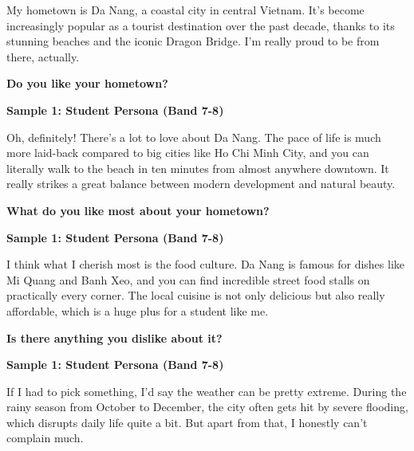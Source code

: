 My hometown is Da Nang, a coastal city in central Vietnam. It's become increasingly popular as a tourist destination over the past decade, thanks to its stunning beaches and the iconic Dragon Bridge. I'm really proud to be from there, actually.

\separator

\begin{ieltsquestion}
\textbf{Do you like your hometown?}
\end{ieltsquestion}
\textbf{Sample 1: Student Persona (Band 7-8)}

Oh, definitely! There's a lot to love about Da Nang. The pace of life is much more laid-back compared to big cities like Ho Chi Minh City, and you can literally walk to the beach in ten minutes from almost anywhere downtown. It really strikes a great balance between modern development and natural beauty.

\separator

\begin{ieltsquestion}
\textbf{What do you like most about your hometown?}
\end{ieltsquestion}
\textbf{Sample 1: Student Persona (Band 7-8)}

I think what I cherish most is the food culture. Da Nang is famous for dishes like Mi Quang and Banh Xeo, and you can find incredible street food stalls on practically every corner. The local cuisine is not only delicious but also really affordable, which is a huge plus for a student like me.

\separator

\begin{ieltsquestion}
\textbf{Is there anything you dislike about it?}
\end{ieltsquestion}
\textbf{Sample 1: Student Persona (Band 7-8)}

If I had to pick something, I'd say the weather can be pretty extreme. During the rainy season from October to December, the city often gets hit by severe flooding, which disrupts daily life quite a bit. But apart from that, I honestly can't complain much.

\separator


